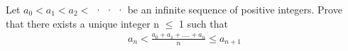 \item Let $a_0 < a_1 < a_2 < $ · · · be an infinite sequence of positive integers. Prove that there exists a unique integer n $\leq$ 1 such that
\begin{align*}
a_n < \frac{a_0 + a_1 +. . . .+ a_n}{n} \leq a_{n+1}
\end{align*}
